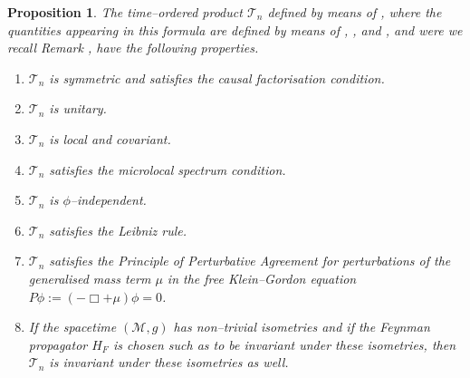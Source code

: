 \documentclass[10pt]{book}
\newcommand{\Mcal}{\mathcal{M}}
\theoremstyle{break}
\newtheorem{proposition}{Proposition}
\begin{document}
\begin{proposition}
The time--ordered product $\mathcal{T}_n$ defined by means of %
, where the quantities appearing in this formula are defined by means of %
, %
, %
and %
, and were we recall Remark %
, have the following properties.
\begin{enumerate}
\item $\mathcal{T}_n$ is symmetric and satisfies the causal factorisation condition.
\item $\mathcal{T}_n$ is unitary.
\item $\mathcal{T}_n$ is local and covariant.
\item $\mathcal{T}_n$ satisfies the microlocal spectrum condition.
\item $\mathcal{T}_n$ is $\phi$--independent.
\item $\mathcal{T}_n$ satisfies the Leibniz rule.
\item $\mathcal{T}_n$ satisfies the Principle of Perturbative Agreement for perturbations of the generalised mass term $\mu$ in the free Klein--Gordon equation $P\phi:=(-\Box + \mu)\phi=0$.
\item If the spacetime $(\Mcal,g)$ has non--trivial isometries and if the Feynman propagator $H_F$ is chosen such as to be invariant under these isometries, then $\mathcal{T}_n$ is invariant under these isometries as well.
\end{enumerate}
\end{proposition}
\end{document}
